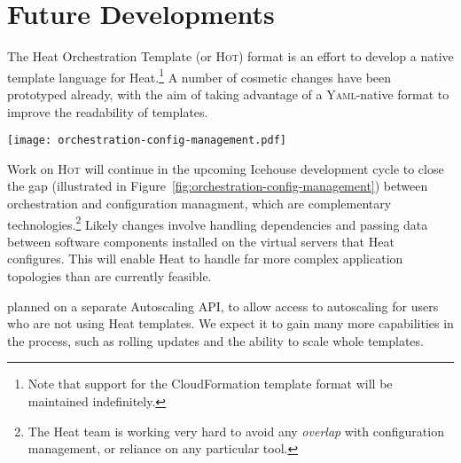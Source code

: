\section{Future Developments}

The Heat Orchestration Template (or \textsc{Hot}) format is an effort to develop a native template language for Heat.\footnote{Note that support for the CloudFormation template format will be maintained indefinitely.} A number of cosmetic changes have been prototyped already, with the aim of taking advantage of a \textsc{Yaml}-native format to improve the readability of templates.

\begin{figure*}[t]
\centering
\texttt{[image: orchestration-config-management.pdf]}
\caption{The relative positioning of Heat compared with other categories of software: configuration management systems (such as Puppet or Chef) and configuration managment--orchestration hybrids (such as Juju).}
\label{fig:orchestration-config-management}
\end{figure*}

Work on \textsc{Hot} will continue in the upcoming Icehouse development cycle to close the gap (illustrated in Figure~\ref{fig:orchestration-config-management}) between orchestration and configuration managment, which are complementary technologies.\footnote{The Heat team is working very hard to avoid any \emph{overlap} with configuration management, or reliance on any particular tool.} Likely changes involve handling dependencies and passing data between software components installed on the virtual servers that Heat configures. This will enable Heat to handle far more complex application topologies than are currently feasible.

 planned on a separate Autoscaling API, to allow access to autoscaling for users who are not using Heat templates. We expect it to gain many more capabilities in the process, such as rolling updates and the ability to scale whole templates.
